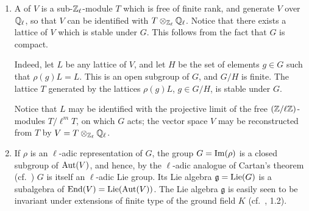 \begin{obs}
\begin{enumerate}
\item\label{rmk:I_11_1}
	A  of $V$ is a sub-$\mathbb{Z}_\ell$-module $T$
	which is free of finite rank, and generate $V$ over $\mathbb{Q}_\ell$, so that
	$V$ can be identified with $T \otimes_{\mathbb{Z}_\ell} \mathbb{Q}_\ell$.  Notice that
	there exists a lattice of $V$ which is stable under $G$. This follows
	from the fact that $G$ is compact.

	Indeed,
	\dpage
	let $L$ be any lattice of $V$, and let $H$ be the set of
	elements $g \in G$ such that $\rho(g)L = L$. This is an open
	subgroup of $G$, and $G/H$ is finite. The lattice $T$
	generated by the lattices $\rho(g)L$, $g \in G/H$, is stable
	under $G$.

	Notice that $L$ may be identified with the projective limit of
	the free $(\mathbb{Z}/\ell\mathbb{Z})$-modules $T/\ell^m T$, on which $G$
	acts; the vector space $V$ may be reconstructed from $T$ by $V
	= T \otimes_{\mathbb{Z}_\ell} \mathbb{Q}_\ell$.

\item If $\rho$ is an $\ell$-adic representation of $G$, the group $G
	= \operatorname{Im}(\rho)$ is a closed subgroup of $\operatorname{Aut}(V)$, and hence, by
	the $\ell$-adic analogue of Cartan's theorem (cf.\ 
	\cite[5-42]{28}) $G$ is itself an $\ell$-adic Lie group.
	Its Lie algebra $\mathfrak{g} = \operatorname{Lie}(G)$ is a subalgebra of
	$\operatorname{End}(V) = \operatorname{Lie}(\operatorname{Aut}(V))$. The Lie algebra $\mathfrak{g}$ is
	easily seen to be invariant under extensions of finite type of
	the ground field $K$ (cf.\ \cite{24}, 1.2).
\end{enumerate}
\end{obs}

